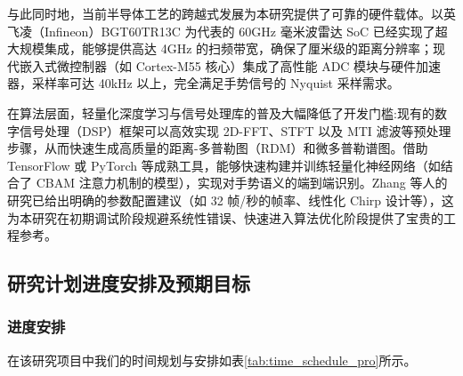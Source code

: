 与此同时地，当前半导体工艺的跨越式发展为本研究提供了可靠的硬件载体。以英飞凌（Infineon）BGT60TR13C 为代表的 60GHz 毫米波雷达 SoC 已经实现了超大规模集成，能够提供高达 4GHz 的扫频带宽，确保了厘米级的距离分辨率；现代嵌入式微控制器（如 Cortex-M55 核心）集成了高性能 ADC 模块与硬件加速器，采样率可达 40kHz 以上，完全满足手势信号的 Nyquist 采样需求。

在算法层面，轻量化深度学习与信号处理库的普及大幅降低了开发门槛:现有的数字信号处理（DSP）框架可以高效实现 2D-FFT、STFT 以及 MTI 滤波等预处理步骤，从而快速生成高质量的距离-多普勒图（RDM）和微多普勒谱图。借助 TensorFlow 或 PyTorch 等成熟工具，能够快速构建并训练轻量化神经网络（如结合了 CBAM 注意力机制的模型），实现对手势语义的端到端识别。Zhang 等人的研究已给出明确的参数配置建议（如 32 帧/秒的帧率、线性化 Chirp 设计等），这为本研究在初期调试阶段规避系统性错误、快速进入算法优化阶段提供了宝贵的工程参考。

\subsection{研究计划进度安排及预期目标}

\subsubsection{进度安排}
在该研究项目中我们的时间规划与安排如表\ref{tab:time_schedule_pro}所示。

